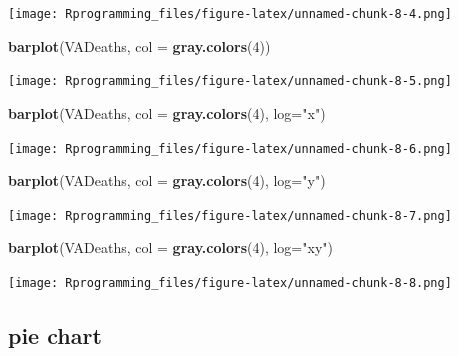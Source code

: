 \documentclass[10pt,]{krantz}
\makeatletter
\newenvironment{Shaded}{\begin{snugshade}}{\end{snugshade}}
\newcommand{\KeywordTok}[1]{\textcolor[rgb]{0.13,0.29,0.53}{\textbf{#1}}}
\newcommand{\DataTypeTok}[1]{\textcolor[rgb]{0.13,0.29,0.53}{#1}}
\newcommand{\DecValTok}[1]{\textcolor[rgb]{0.00,0.00,0.81}{#1}}
\newcommand{\StringTok}[1]{\textcolor[rgb]{0.31,0.60,0.02}{#1}}
\newcommand{\NormalTok}[1]{#1}
\newenvironment{kframe}{%
\medskip{}
\setlength{\fboxsep}{.8em}
 \def\at@end@of@kframe{}%
 \ifinner\ifhmode%
  \def\at@end@of@kframe{\end{minipage}}%
  \begin{minipage}{\columnwidth}%
 \fi\fi%
 \def\FrameCommand##1{\hskip\@totalleftmargin \hskip-\fboxsep
 \colorbox{shadecolor}{##1}\hskip-\fboxsep
     \hskip-\linewidth \hskip-\@totalleftmargin \hskip\columnwidth}%
 \MakeFramed {\advance\hsize-\width
   \@totalleftmargin\z@ \linewidth\hsize
   \@setminipage}}%
 {\par\unskip\endMakeFramed%
 \at@end@of@kframe}
\renewenvironment{Shaded}{\begin{kframe}}{\end{kframe}}
\theoremstyle{definition}
\theoremstyle{definition}
\theoremstyle{remark}
\makeatother
\begin{document}
\texttt{[image: Rprogramming\_files/figure-latex/unnamed-chunk-8-4.png]}

\begin{Shaded}
\begin{Highlighting}[]

\KeywordTok{barplot}\NormalTok{(VADeaths, }\DataTypeTok{col =} \KeywordTok{gray.colors}\NormalTok{(}\DecValTok{4}\NormalTok{))}
\end{Highlighting}
\end{Shaded}

\texttt{[image: Rprogramming\_files/figure-latex/unnamed-chunk-8-5.png]}

\begin{Shaded}
\begin{Highlighting}[]

\KeywordTok{barplot}\NormalTok{(VADeaths, }\DataTypeTok{col =} \KeywordTok{gray.colors}\NormalTok{(}\DecValTok{4}\NormalTok{), }\DataTypeTok{log=}\StringTok{"x"}\NormalTok{)}
\end{Highlighting}
\end{Shaded}

\texttt{[image: Rprogramming\_files/figure-latex/unnamed-chunk-8-6.png]}

\begin{Shaded}
\begin{Highlighting}[]
\KeywordTok{barplot}\NormalTok{(VADeaths, }\DataTypeTok{col =} \KeywordTok{gray.colors}\NormalTok{(}\DecValTok{4}\NormalTok{), }\DataTypeTok{log=}\StringTok{"y"}\NormalTok{)}
\end{Highlighting}
\end{Shaded}

\texttt{[image: Rprogramming\_files/figure-latex/unnamed-chunk-8-7.png]}

\begin{Shaded}
\begin{Highlighting}[]
\KeywordTok{barplot}\NormalTok{(VADeaths, }\DataTypeTok{col =} \KeywordTok{gray.colors}\NormalTok{(}\DecValTok{4}\NormalTok{), }\DataTypeTok{log=}\StringTok{"xy"}\NormalTok{)}
\end{Highlighting}
\end{Shaded}

\texttt{[image: Rprogramming\_files/figure-latex/unnamed-chunk-8-8.png]}

\subsection{pie chart}\label{pie-chart}
\end{document}
